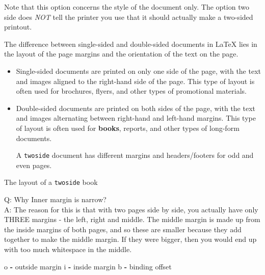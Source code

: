 \documentclass[
  a4paper,
  twoside,
  openright]{book}
\newenvironment{Shaded}{\begin{snugshade}}{\end{snugshade}}
\newcommand{\NormalTok}[1]{#1}
\newcommand{\SpecialCharTok}[1]{\textcolor[rgb]{0.81,0.36,0.00}{\textbf{#1}}}
\theoremstyle{definition}
\theoremstyle{definition}
\theoremstyle{definition}
\theoremstyle{definition}
\theoremstyle{remark}
\begin{document}
\begin{itemize}
\begin{itemize}
    Note that this option concerns the style of the document only. The option two side does \emph{NOT} tell the printer you use that it should actually make a two-sided printout.

    The difference between single-sided and double-sided documents in LaTeX lies in the layout of the page margins and the orientation of the text on the page.

    \begin{itemize}
    \item
      Single-sided documents are printed on only one side of the page, with the text and images aligned to the right-hand side of the page. This type of layout is often used for brochures, flyers, and other types of promotional materials.
    \item
      Double-sided documents are printed on both sides of the page, with the text and images alternating between right-hand and left-hand margins. This type of layout is often used for \textbf{books}, reports, and other types of long-form documents.

      A \texttt{twoside} document has different margins and headers/footers for odd and even pages.
    \end{itemize}

    The layout of a \texttt{twoside} book

    Q: Why Inner margin is narrow?\\
    A: The reason for this is that with two pages side by side, you actually have only THREE margins - the left, right and middle. The middle margin is made up from the inside margins of both pages, and so these are smaller because they add together to make the middle margin. If they were bigger, then you would end up with too much whitespace in the middle.

\begin{Shaded}
\begin{Highlighting}[]
\NormalTok{o }\SpecialCharTok{{-}}\NormalTok{ outside margin}
\NormalTok{i }\SpecialCharTok{{-}}\NormalTok{ inside margin}
\NormalTok{b }\SpecialCharTok{{-}}\NormalTok{ binding offset}


\end{Highlighting}
\end{Shaded}
\end{itemize}
\end{itemize}
\end{document}
